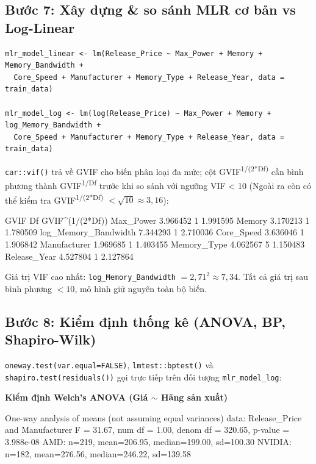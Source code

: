 \subsection{Bước 7: Xây dựng \& so sánh MLR cơ bản vs Log-Linear}
\label{sec:buoc_7}
\begin{verbatim}
mlr_model_linear <- lm(Release_Price ~ Max_Power + Memory + Memory_Bandwidth +
  Core_Speed + Manufacturer + Memory_Type + Release_Year, data = train_data)

mlr_model_log <- lm(log(Release_Price) ~ Max_Power + Memory + log_Memory_Bandwidth +
  Core_Speed + Manufacturer + Memory_Type + Release_Year, data = train_data)
\end{verbatim}

\texttt{car::vif()} trả về GVIF cho biến phân loại đa mức; cột GVIF\textsuperscript{1/(2*Df)} cần bình phương thành GVIF\textsuperscript{1/Df} trước khi so sánh với ngưỡng VIF < 10 (Ngoài ra còn có thể kiểm tra GVIF\textsuperscript{1/(2*Df)} $< \sqrt{10} \approx 3{,}16$):
\begin{rconsole}
                         GVIF Df GVIF^(1/(2*Df))
Max_Power            3.966452  1        1.991595
Memory               3.170213  1        1.780509
log_Memory_Bandwidth 7.344293  1        2.710036
Core_Speed           3.636046  1        1.906842
Manufacturer         1.969685  1        1.403455
Memory_Type          4.062567  5        1.150483
Release_Year         4.527804  1        2.127864
\end{rconsole}
Giá trị VIF cao nhất: \texttt{log\_Memory\_Bandwidth} $= 2{,}71^2 \approx 7{,}34$. Tất cả giá trị sau bình phương $< 10$, mô hình giữ nguyên toàn bộ biến.

\subsection{Bước 8: Kiểm định thống kê (ANOVA, BP, Shapiro-Wilk)}
\label{sec:buoc_8}
\texttt{oneway.test(var.equal=FALSE)}, \texttt{lmtest::bptest()} và \texttt{shapiro.test(residuals())} gọi trực tiếp trên đối tượng \texttt{mlr\_model\_log}:

\textbf{Kiểm định Welch's ANOVA (Giá $\sim$ Hãng sản xuất)}
\begin{rconsole}
	One-way analysis of means (not assuming equal variances)
data:  Release_Price and Manufacturer
F = 31.67, num df = 1.00, denom df = 320.65, p-value = 3.988e-08
AMD: n=219, mean=206.95, median=199.00, sd=100.30
NVIDIA: n=182, mean=276.56, median=246.22, sd=139.58
\end{rconsole}

